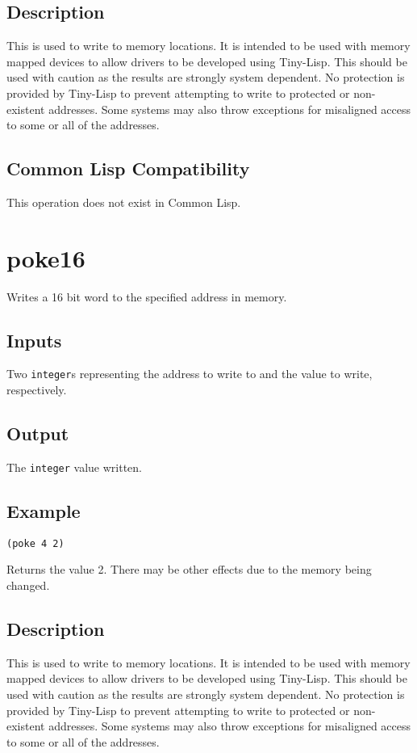 \documentclass[10pt, openany]{book}
\newcommand{\datatype}[1]{\texttt{#1}}
\newcommand{\tl}{Tiny-Lisp}
\newcommand{\cl}{Common Lisp}
\begin{document}
\subsection{Description}
This is used to write to memory locations.  It is intended to be used with memory mapped devices to allow drivers to be developed using \tl{}.  This should be used with caution as the results are strongly system dependent.  No protection is provided by \tl{} to prevent attempting to write to protected or non-existent addresses.  Some systems may also throw exceptions for misaligned access to some or all of the addresses.
\subsection{Common Lisp Compatibility}
This operation does not exist in \cl.

\section{poke16}
Writes a 16 bit word to the specified address in memory.
\subsection{Inputs}
Two \datatype{integer}s representing the address to write to and the value to write, respectively.
\subsection{Output}
The \datatype{integer} value written.
\subsection{Example}
\begin{lstlisting}
(poke 4 2)
\end{lstlisting}
Returns the value 2.  There may be other effects due to the memory being changed.
\subsection{Description}
This is used to write to memory locations.  It is intended to be used with memory mapped devices to allow drivers to be developed using \tl{}.  This should be used with caution as the results are strongly system dependent.  No protection is provided by \tl{} to prevent attempting to write to protected or non-existent addresses.  Some systems may also throw exceptions for misaligned access to some or all of the addresses.
\end{document}
